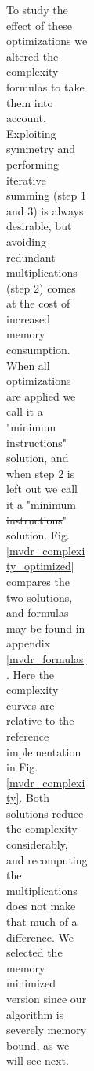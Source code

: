 \documentclass[12pt,journal,draftclsnofoot,onecolumn]{IEEEtran}
\let\MYoriglatexcaption\caption               %
\renewcommand{\caption}[2][\relax]{\MYoriglatexcaption[#2]{#2}}
\newcommand\1{\vec 1}
\providecommand{\DIFaddtex}[1]{{\protect\color{blue}\uwave{#1}}} %
\providecommand{\DIFdeltex}[1]{{\protect\color{red}\sout{#1}}}                      %
\providecommand{\DIFaddbegin}{} %
\providecommand{\DIFaddend}{} %
\providecommand{\DIFdelbegin}{} %
\providecommand{\DIFdelend}{} %
\providecommand{\DIFadd}[1]{\texorpdfstring{\DIFaddtex{#1}}{#1}} %
\providecommand{\DIFdel}[1]{\texorpdfstring{\DIFdeltex{#1}}{}} %
\begin{document}
\begin{figure}
\begin{figure}
\begin{figure}
\begin{figure}
\begin{figure}
\begin{figure}
\end{figure}
To study the effect of these optimizations we altered the complexity formulas to take them into account. Exploiting symmetry and performing iterative summing (step 1 and 3) is always desirable, but avoiding redundant multiplications (step 2) comes at the cost of increased memory consumption. When all optimizations are applied we call it a "minimum instructions" solution, and when step 2 is left out we call it a "minimum \DIFdelbegin \DIFdel{instructions}\DIFdelend \DIFaddbegin \DIFadd{memory}\DIFaddend " solution. Fig. \ref{mvdr_complexity_optimized} compares the two solutions, and formulas may be found in appendix \ref{mvdr_formulas}. Here the complexity curves are relative to the reference implementation in Fig. \ref{mvdr_complexity}. Both solutions reduce the complexity considerably, and recomputing the multiplications does not make that much of a difference. We selected the memory minimized version since our algorithm is severely memory bound, as we will see next.


\DIFdelbegin %


\end{figure}
\end{figure}
\end{figure}
\end{figure}
\end{figure}
\end{document}

